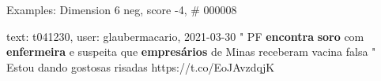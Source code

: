 \begin{frame}{Examples: Dimension 6 neg, score -4, \# 000008}
\footnotesize
\begin{alertblock}{text: t041230, user: glaubermacario, 2021-03-30}
" PF \textbf{encontra} \textbf{soro} com \textbf{enfermeira} e suspeita que 
\textbf{empresários} de Minas receberam vacina falsa " Estou dando gostosas 
risadas https://t.co/EoJAvzdqjK 
\end{alertblock}
\end{frame}
